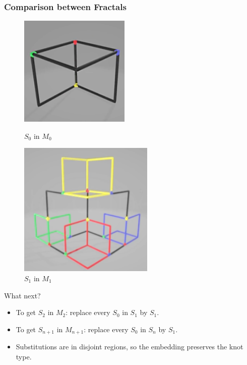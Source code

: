 \begin{frame}
	\frametitle{Comparison between Fractals} %
	\begin{figure}[!htb]
		\begin{minipage}{0.48\textwidth}
			\centering
			\includegraphics[width=0.42\linewidth]{images/Comparison1}
			\caption{$S_0$ in $M_0$ \cite{broden2024knotsinsidefractals}}\label{Fig:Data1}
		\end{minipage}\hfill
		\begin{minipage}{0.48\textwidth}
			\centering
			\includegraphics[width=0.42\linewidth]{images/Comparison2}
			\caption{$S_1$ in $M_1$ \cite{broden2024knotsinsidefractals}}\label{Fig:Data2}
		\end{minipage}
	\end{figure}
	What next?
	\onslide<3->
	\begin{itemize}
		\item To get $S_2$ in $M_2$: replace every $S_0$ in $S_1$ by $S_1.$
		\onslide<4->
		\item To get $S_{n+1}$ in $M_{n+1}$: replace every $S_0$ in $S_n$ by $S_1.$
		\onslide<5->
		\item Substitutions are in disjoint regions, so the embedding preserves the knot type.
	\end{itemize}
\end{frame}


